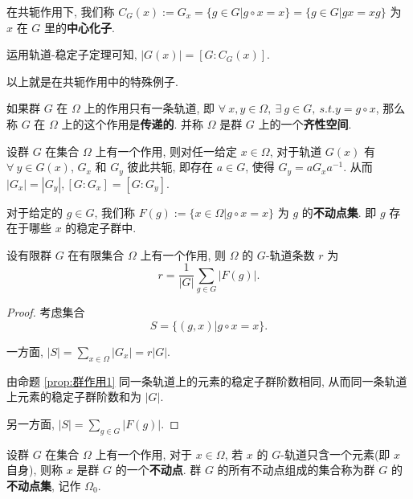 \begin{definition}\label{中心化子}
	在共轭作用下, 我们称 $C_G(x):=G_x=\{g\in G|g\circ x=x\}=\{g\in G|gx=xg\}$ 为 $x$ 在 $G$ 里的\textbf{中心化子}.
\end{definition}

\begin{corollary}
	运用轨道-稳定子定理可知, $|G(x)|=[G:C_G(x)]$.
\end{corollary}

以上就是在共轭作用中的特殊例子.

\begin{definition}\label{齐性空间}
	如果群 $G$ 在 $\Omega$ 上的作用只有一条轨道, 即 $\forall\ x,y\in\Omega,\ \exists\ g\in G,\ s.t. y=g\circ x$, 那么称 $G$ 在 $\Omega$ 上的这个作用是\textbf{传递的}. 并称 $\Omega$ 是群 $G$ 上的一个\textbf{齐性空间}.
\end{definition}

\begin{proposition}\label{prop:群作用1}
	设群 $G$ 在集合 $\Omega$ 上有一个作用, 则对任一给定 $x\in \Omega$, 对于轨道 $G(x)$ 有 $\forall\ y\in G(x)$, $G_x$ 和 $G_y$ 彼此共轭, 即存在 $a\in G$, 使得 $G_y=aG_x a^{-1}$. 从而 $|G_x|=|G_y|,[G:G_x]=[G:G_y]$.
\end{proposition}

\begin{definition}\label{不动点集}
	对于给定的 $g\in G$, 我们称 $F(g):=\{x\in\Omega|g\circ x=x\}$ 为 $g$ 的\textbf{不动点集}. 即 $g$ 存在于哪些 $x$ 的稳定子群中.
\end{definition}

\begin{theorem}[\t{Burnside} 引理]\label{Burnside}
	设有限群 $G$ 在有限集合 $\Omega$ 上有一个作用, 则 $\Omega$ 的 $G$-轨道条数 $r$ 为 $$r=\frac{1}{|G|}\sum\limits_{g\in G}|F(g)|.$$
\end{theorem}

\begin{proof}
	考虑集合 $$S=\{(g,x)|g\circ x=x\}.$$

	一方面, $|S|=\sum\limits_{x\in \Omega}|G_x|=r|G|$.

	由命题 \ref{prop:群作用1} 同一条轨道上的元素的稳定子群阶数相同, 从而同一条轨道上元素的稳定子群阶数和为 $|G|$.

	另一方面, $|S|=\sum\limits_{g\in G}|F(g)|$.
\end{proof}

\begin{definition}\label{不动点}
	设群 $G$ 在集合 $\Omega$ 上有一个作用, 对于 $x\in\Omega$, 若 $x$ 的 $G$-轨道只含一个元素(即 $x$ 自身), 则称 $x$ 是群 $G$ 的一个\textbf{不动点}. 群 $G$ 的所有不动点组成的集合称为群 $G$ 的\textbf{不动点集}, 记作 $\Omega_0$.
\end{definition}


